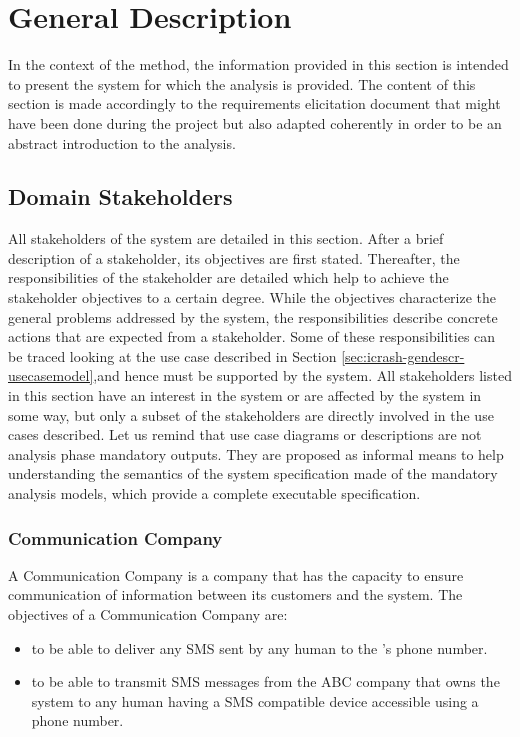 
\chapter{General Description}
\label{chap:general_description}

In the context of the \msrmessir method, the information provided in this section is intended to present the system for which the \msrmessir analysis is provided. The content of this section is made accordingly to the requirements elicitation document that might have been done during the project but also adapted coherently in order to be an abstract introduction to the \msrmessir analysis.

\section{Domain Stakeholders}
\label{sec:icrash-gendescr-stakeholders}

All stakeholders of the system are detailed in this section. After a brief description of a
stakeholder, its objectives are first stated. Thereafter, the responsibilities of
the stakeholder are detailed which help to achieve the stakeholder objectives to a certain
degree. While the objectives characterize the general problems addressed by the \msricrash system,
the responsibilities describe concrete actions that are expected from a stakeholder. Some of
these responsibilities can be traced looking at the use case described in Section \ref{sec:icrash-gendescr-usecasemodel},and hence must be supported by the \msricrash  system. 
All stakeholders listed in this section have an interest in the system or are affected
by the system in some way, but only a subset of the stakeholders are directly involved in the use
cases described.
Let us remind that use case diagrams or descriptions are not \msrmessir analysis phase mandatory outputs. They are proposed as informal means to help understanding the semantics of the system specification made of the mandatory analysis models, which provide a complete executable specification.

\subsection{Communication Company}
A Communication Company is a company that has the capacity to ensure communication of information between its customers and the \msricrash system. 
The objectives of a Communication Company are:
\begin{itemize}
  \item to be able to deliver any SMS sent by any human to the \msricrash's phone number.
  \item to be able to transmit SMS messages from the ABC company that owns the \msricrash system to any human having a SMS compatible device accessible using a phone number.
\end{itemize}
\vspace{0.5cm}

